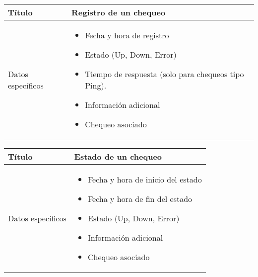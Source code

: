 \begin{center}
  
  \begin{tabularx}{\textwidth}{|l|X|}
    \hline

    Título & Registro de un chequeo \\

    \hline
    Datos específicos &

    \begin{itemize}
    \item Fecha y hora de registro
    \item Estado (Up, Down, Error)
    \item Tiempo de respuesta (solo para chequeos tipo Ping).
    \item Información adicional
    \item Chequeo asociado
    \end{itemize}
    \\
    
    \hline
    
  \end{tabularx}
\end{center}

\begin{center}
  
  \begin{tabularx}{\textwidth}{|l|X|}
    \hline

    Título & Estado de un chequeo \\

    \hline
    Datos específicos &

    \begin{itemize}
    \item Fecha y hora de inicio del estado
    \item Fecha y hora de fin del estado
    \item Estado (Up, Down, Error)
    \item Información adicional
    \item Chequeo asociado
    \end{itemize}
    \\
    
    \hline
    
  \end{tabularx}
\end{center}


